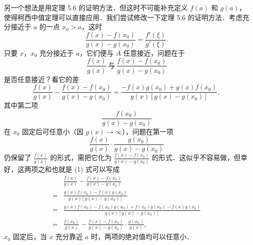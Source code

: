 另一个想法是用定理 5.6 的证明方法．但这时不可能补充定义 $f(a)$ 和 $g(a)$，使得柯西中值定理可以直接应用．我们尝试修改一下定理 5.6 的证明方法．考虑充分接近于 $a$ 的一点 $x_0 > a$，这时
\[
\frac{f(x) - f(x_0)}{g(x) - g(x_0)} = \frac{f'(\xi)}{g'(\xi)}.
\]
只要 $x$，$x_0$ 充分接近于 $a$，它们便与 $A$ 任意接近，问题在于
\[
\frac{f(x)}{g(x)}\ \text{与}\ \frac{f(x) - f(x_0)}{g(x) - g(x_0)}
\]
是否任意接近？看它的差
\begin{equation}
\frac{f(x)}{g(x)} - \frac{f(x) - f(x_0)}{g(x) - g(x_0)}
= \frac{-f(x)g(x_0) + g(x)f(x_0)}{g(x)\left[g(x) - g(x_0)\right]},
\tag*{(1)}
\end{equation}
其中第二项
\[
\frac{f(x_0)}{g(x) - g(x_0)}
\]
在 $x_0$ 固定后可任意小（因 $g(x) \to \infty$），问题在第一项
\[
\frac{f(x)}{g(x)}\cdot\frac{g(x_0)}{g(x) - g(x_0)}
\]
仍保留了 $\frac{f(x)}{g(x)}$ 的形式，需把它化为 $\frac{f(x) - f(x_0)}{g(x) - g(x_0)}$ 的形式．这似乎不容易做，但幸好，这两项之和也就是 (1) 式可以写成
\begin{align*}
&\frac{f(x)}{g(x)} - \frac{f(x) - f(x_0)}{g(x) - g(x_0)}\\
={}&\frac{g(x)f(x_0) - f(x)g(x_0)}{g(x)\left[g(x) - g(x_0)\right]}\\
={}&\frac{g(x)f(x_0) - f(x_0)g(x_0) + f(x_0)g(x_0) - f(x)g(x_0)}{g(x)\left[g(x) - g(x_0)\right]}\\
={}&\frac{f(x_0)}{g(x)} - \frac{f(x) - f(x_0)}{g(x) - g(x_0)}\cdot\frac{g(x_0)}{g(x)},
\tag*{(2)}
\end{align*}
$x_0$ 固定后，当 $x$ 充分靠近 $a$ 时，两项的绝对值均可以任意小．

